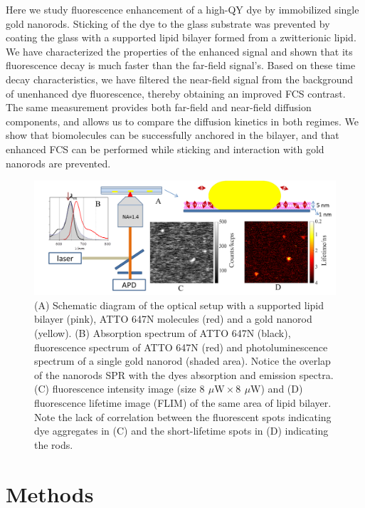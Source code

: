 \documentclass[journal=jpccck,manuscript=article]{achemso}
\newcommand{\uW}{\ensuremath{\,\mu\textrm{W}}}
\begin{document}
Here we study fluorescence enhancement of a high-QY dye by immobilized single gold nanorods. Sticking of the dye to 
the glass substrate was prevented by coating the glass with a supported lipid bilayer formed from a zwitterionic lipid. 
We have characterized the properties of the enhanced signal and shown that its fluorescence decay is much faster than 
the far-field signal’s. Based on these time decay characteristics, we have filtered the near-field signal from the 
background of unenhanced dye fluorescence, thereby obtaining an improved FCS contrast. The same measurement provides 
both far-field and near-field diffusion components, and allows us to compare the diffusion kinetics in both regimes. 
We show that biomolecules can be successfully anchored in the bilayer, and that enhanced FCS can be performed while 
sticking and interaction with gold nanorods are prevented.\\
\begin{figure}
	\centering
	\includegraphics[width=\textwidth]{schematic.png}
	\caption{(A) Schematic diagram of the optical setup with a supported lipid bilayer (pink), ATTO 647N molecules 
	(red) and a gold nanorod (yellow). (B) Absorption spectrum of ATTO 647N (black), fluorescence spectrum of 
	ATTO 647N (red) and photoluminescence spectrum of a single gold nanorod (shaded area). Notice the overlap of the 
	nanorod\textquotesingle s SPR with the dye\textquotesingle s absorption and emission spectra. (C) fluorescence 
	intensity image (size $8~\uW \times 8~\uW$) and (D) fluorescence lifetime image (FLIM) of the same area of 
	lipid bilayer. Note the lack of correlation between the fluorescent spots indicating dye aggregates in (C) and 
	the short-lifetime spots in (D) indicating the rods.}
	\label{fig:schematic}
\end{figure}
\section{Methods}
\end{document}
